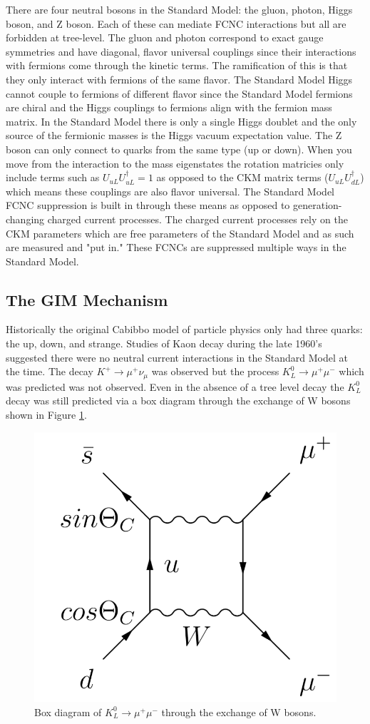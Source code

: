 There are four neutral bosons in the Standard Model: the gluon, photon, Higgs boson, and Z boson.  Each of these can mediate FCNC interactions but all are forbidden at tree-level.  The gluon and photon correspond to exact gauge symmetries and have diagonal, flavor universal couplings since their interactions with fermions come through the kinetic terms.  The ramification of this is that they only interact with fermions of the same flavor.  The Standard Model Higgs cannot couple to fermions of different flavor since the Standard Model fermions are chiral and the Higgs couplings to fermions align with the fermion mass matrix.  In the Standard Model there is only a single Higgs doublet and the only source of the fermionic masses is the Higgs vacuum expectation value.  The Z boson can only connect to quarks from the same type (up or down).  When you move from the interaction to the mass eigenstates the rotation matricies only include terms such as $U_{uL}U_{uL}^\dagger = 1$ as opposed to the CKM matrix terms ($U_{uL}U_{dL}^\dagger$) which means these couplings are also flavor universal. 
The Standard Model FCNC suppression is built in through these means as opposed to generation-changing charged current processes.  The charged current processes rely on the CKM parameters which are free parameters of the Standard Model and as such are measured and "put in."  These FCNCs are suppressed multiple ways in the Standard Model.

\subsection{The GIM Mechanism}
Historically the original Cabibbo model of particle physics only had three quarks: the up, down, and strange.  Studies of Kaon decay during the late 1960's suggested there were no neutral current interactions in the Standard Model at the time.  The decay $K^+ \rightarrow \mu^+ \nu_\mu$ was observed but the process $K_L^0 \rightarrow \mu^+ \mu^- $ which was predicted was not observed.  Even in the absence of a tree level decay the $K_L^0$ decay was still predicted via a box diagram through the exchange of W bosons shown in Figure \ref{fig:KaonBox}.

\begin{figure}[h!]
	\centering
	\includegraphics[width=.4\columnwidth]{../ThesisImages/Theory/GIMDiagramsa.png}
	\caption{Box diagram of $K_L^0 \rightarrow \mu^+ \mu^-$ through the exchange of W bosons.}
	\label{fig:KaonBox}
\end{figure}

